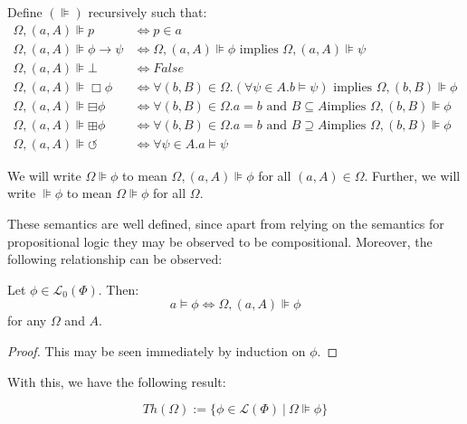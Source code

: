\begin{definition}\label{evil-semantics-def}
 Define $(\VDash)$ recursively such that:
\begin{align*}
  {\Omega},(a,A){\VDash} p & {\iff}p{\in}a\\
  {\Omega},(a,A){\VDash} {\phi}{\rightarrow}{\psi} &
  {\iff}{\Omega},(a,A){\VDash}{\phi}\text{ implies
  }{\Omega},(a,A){\VDash}{\psi}\\
  {\Omega},(a,A){\VDash}{\bot} & {\iff} False\\
  {\Omega},(a,A){\VDash}\Box {\phi} & {\iff}{\forall}(b,B){\in}{\Omega}.
  ({\forall}{\psi}{\in}A. b{\models}{\psi})\text{ implies
  }{\Omega},(b,B){\VDash}{\phi}\\
  {\Omega},(a,A){\VDash}{\boxminus}{\phi} &
  {\iff}{\forall}(b,B){\in}{\Omega}. a=b\text{ and }B{\subseteq}A\text{
  implies }{\Omega},(b,B){\VDash}{\phi}\\
  {\Omega},(a,A){\VDash}{\boxplus}{\phi} &
  {\iff}{\forall}(b,B){\in}{\Omega}. a=b\text{ and }B{\supseteq}A\text{
  implies }{\Omega},(b,B){\VDash}{\phi}\\
  {\Omega},(a,A){\VDash}{\circlearrowleft} & {\iff}
  {\forall}{\psi}{\in}A.a{\models}{\psi}
\end{align*}
\end{definition}
\begin{remark}
We will write $\Omega \VDash \phi$ to mean $\Omega, (a,A) \VDash \phi$
for all $(a,A) \in \Omega$.  Further, we will write $\VDash \phi$ to
mean $\Omega \VDash \phi$ for all $\Omega$.
\end{remark}
These semantics are well defined, since apart from relying on the semantics
for propositional logic they may be observed to be compositional.
Moreover, the following relationship can be observed:

\begin{lemma}[Truthiness]\label{truthiness}
  Let $\phi \in \mathcal{L}_0 (\Phi)$.  Then:
  \[ a \models \phi \Longleftrightarrow \Omega, (a, A) \VDash \phi \]
  for any $\Omega$ and $A$.
\end{lemma}
\begin{proof}
  This may be seen immediately by induction on $\phi$.
\end{proof}

With this, we have the following result:
\begin{definition}\label{EvilTheorydef}
 $$Th(\Omega) := \{ \phi \in \mathcal{L}(\Phi) \ |\ \Omega \VDash \phi \}$$
\end{definition}

